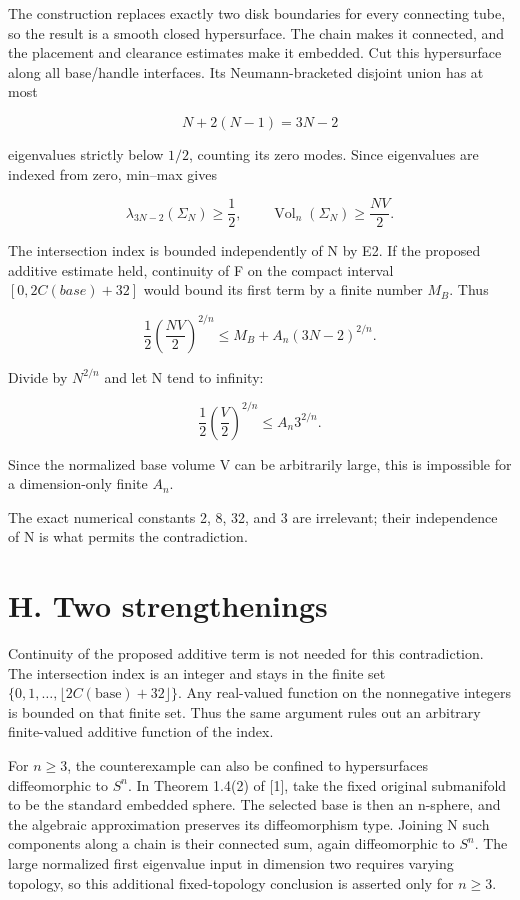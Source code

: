 \documentclass[11pt,a4paper]{article}
\begin{document}
The construction replaces exactly two disk boundaries for every
connecting tube, so the result is a smooth closed hypersurface. The
chain makes it connected, and the placement and clearance estimates make
it embedded. Cut this hypersurface along all base/handle interfaces. Its
Neumann-bracketed disjoint union has at most

\[
 N+2(N-1)=3N-2
\]

eigenvalues strictly below \(1/2\), counting its zero modes. Since
eigenvalues are indexed from zero, min--max gives

\[
 \lambda_{3N-2}(\Sigma_N)\ge\frac12,
 \qquad
 \operatorname{Vol}_n(\Sigma_N)\ge\frac{NV}{2}.
 \tag{G1}
\]

The intersection index is bounded independently of N by E2. If the
proposed additive estimate held, continuity of F on the compact interval
\([0,2C(base)+32]\) would bound its first term by a finite number
\(M_B\). Thus

\[
 \frac12\left(\frac{NV}{2}\right)^{2/n}
 \le M_B+A_n(3N-2)^{2/n}.
\]

Divide by \(N^{2/n}\) and let N tend to infinity:

\[
 \frac12\left(\frac V2\right)^{2/n}\le A_n3^{2/n}.
\]

Since the normalized base volume V can be arbitrarily large, this is
impossible for a dimension-only finite \(A_n\).

The exact numerical constants 2, 8, 32, and 3 are irrelevant; their
independence of N is what permits the contradiction.

\hypertarget{1022-h.-two-strengthenings}{%
\section{H. Two strengthenings}\label{1022-h.-two-strengthenings}}

Continuity of the proposed additive term is not needed for this
contradiction. The intersection index is an integer and stays in the
finite set \(\{0,1,\ldots,\lfloor 2C(\mathrm{base})+32\rfloor\}\). Any
real-valued function on the nonnegative integers is bounded on that
finite set. Thus the same argument rules out an arbitrary finite-valued
additive function of the index.

For \(n\ge 3\), the counterexample can also be confined to hypersurfaces
diffeomorphic to \(S^n\). In Theorem 1.4(2) of {[}1{]}, take the fixed
original submanifold to be the standard embedded sphere. The selected
base is then an n-sphere, and the algebraic approximation preserves its
diffeomorphism type. Joining N such components along a chain is their
connected sum, again diffeomorphic to \(S^n\). The large normalized
first eigenvalue input in dimension two requires varying topology, so
this additional fixed-topology conclusion is asserted only for
\(n\ge 3\).
\end{document}
